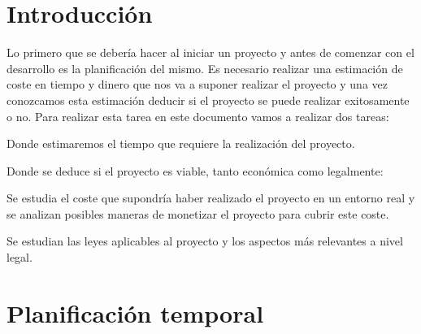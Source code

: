 \label{anex:A}

\section{Introducción}

Lo primero que se debería hacer al iniciar un proyecto y antes de comenzar con el desarrollo es la planificación del mismo. Es necesario realizar una estimación de coste en tiempo y dinero que nos va a suponer realizar el proyecto y una vez conozcamos esta estimación deducir si el proyecto se puede realizar exitosamente o no. 
Para realizar esta tarea en este documento vamos a realizar dos tareas:

\begin{description}
	\tightlist
	\item[Planificación temporal.] Donde estimaremos el tiempo que requiere la realización del proyecto.
	\item[Estudio de la viabilidad.] Donde se deduce si el proyecto es viable, tanto económica como legalmente: 
	\begin{description}
		\tightlist
		\item[Viabilidad económica.] Se estudia el coste que supondría haber realizado el proyecto en un entorno real y se analizan posibles maneras de monetizar el proyecto para cubrir este coste.
		\item[Viabilidad legal.] Se estudian las leyes aplicables al proyecto y los aspectos más relevantes a nivel legal.
	\end{description}
\end{description}

\section{Planificación temporal}

